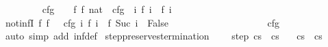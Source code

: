 \begin{isabellebody}
\ {\isacharparenleft}{\isachardoublequoteopen}{\isacharunderscore}{\isasymturnstile}\ {\isacharunderscore}\ {\isasymrightarrow}\ {\isasymdots}{\isacharprime}{\isacharparenleft}{\isasyminfinity}{\isacharprime}{\isacharparenright}{\isachardoublequoteclose}\ {\isacharbrackleft}{}{}{\isacharcomma}{}{}{\isacharbrackright}\ {}{}{}{\isacharparenright}\ \isanewline
{\isachardoublequoteopen}{\isasymGamma}{\isasymturnstile}\ cfg\ {\isasymrightarrow}\ {\isasymdots}{\isacharparenleft}{\isasyminfinity}{\isacharparenright}\ {\isasymequiv}\ {\isacharparenleft}{\isasymexists}f{\isachardot}\ f\ {\isacharparenleft}{}{\isacharcolon}{\isacharcolon}nat{\isacharparenright}\ {\isacharequal}\ cfg\ {\isasymand}\ {\isacharparenleft}{\isasymforall}i{\isachardot}\ {\isasymGamma}{\isasymturnstile}f\ i\ {\isasymrightarrow}\ f\ {\isacharparenleft}i{\isacharplus}{}{\isacharparenright}{\isacharparenright}{\isacharparenright}{\isachardoublequoteclose}\ \isanewline
\isanewline
{}\isamarkupfalse%
\ not{\isacharunderscore}infI{\isacharcolon}\ {\isachardoublequoteopen}{\isasymlbrakk}{\isasymAnd}f{\isachardot}\ {\isasymlbrakk}f\ {}\ {\isacharequal}\ cfg{\isacharsemicolon}\ {\isasymAnd}i{\isachardot}\ {\isasymGamma}{\isasymturnstile}f\ i\ {\isasymrightarrow}\ f\ {\isacharparenleft}Suc\ i{\isacharparenright}{\isasymrbrakk}\ {\isasymLongrightarrow}\ False{\isasymrbrakk}\ \ \isanewline
\ \ \ \ \ \ \ \ \ \ \ \ \ \ \ \ {\isasymLongrightarrow}\ {\isasymnot}{\isasymGamma}{\isasymturnstile}\ cfg\ {\isasymrightarrow}\ {\isasymdots}{\isacharparenleft}{\isasyminfinity}{\isacharparenright}{\isachardoublequoteclose}\isanewline
%
\isadelimproof
\ \ %
\endisadelimproof
%
\isatagproof
{}\isamarkupfalse%
\ {\isacharparenleft}auto\ simp\ add{\isacharcolon}\ inf{\isacharunderscore}def{\isacharparenright}%
\endisatagproof
{\isafoldproof}%
%
\isadelimproof
%
\endisadelimproof
%
\isamarkuptrue%
\isamarkupfalse%
\ step{\isacharunderscore}preserves{\isacharunderscore}termination{\isacharcolon}\ \isanewline
\ \ \ step{\isacharcolon}\ {\isachardoublequoteopen}{\isasymGamma}{\isasymturnstile}{\isacharparenleft}c{\isacharcomma}s{\isacharparenright}\ {\isasymrightarrow}\ {\isacharparenleft}c{\isacharprime}{\isacharcomma}s{\isacharprime}{\isacharparenright}{\isachardoublequoteclose}\isanewline
\ \ \ {\isachardoublequoteopen}{\isasymGamma}{\isasymturnstile}c{\isasymdown}s\ {\isasymLongrightarrow}\ {\isasymGamma}{\isasymturnstile}c{\isacharprime}{\isasymdown}s{\isacharprime}{\isachardoublequoteclose}\ \ \isanewline

\end{isabellebody}
